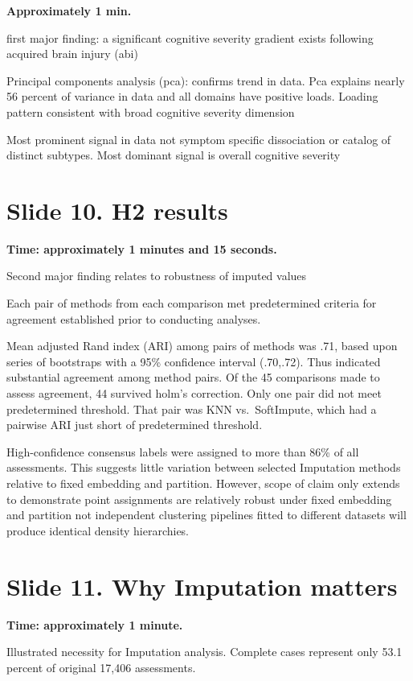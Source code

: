 \documentclass[
  11pt,
]{article}
\begin{document}
\textbf{Approximately 1 min.}

first major finding: a significant cognitive severity gradient exists
following acquired brain injury (abi)

Principal components analysis (pca): confirms trend in data. Pca
explains nearly 56 percent of variance in data and all domains have
positive loads. Loading pattern consistent with broad cognitive severity
dimension

Most prominent signal in data not symptom specific dissociation or
catalog of distinct subtypes. Most dominant signal is overall cognitive
severity

\section{Slide 10. H2 results}\label{slide-10.-h2-results}

\textbf{Time: approximately 1 minutes and 15 seconds.}

Second major finding relates to robustness of imputed values

Each pair of methods from each comparison met predetermined criteria for
agreement established prior to conducting analyses.

Mean adjusted Rand index (ARI) among pairs of methods was .71, based
upon series of bootstraps with a 95\% confidence interval (.70,.72).
Thus indicated substantial agreement among method pairs. Of the 45
comparisons made to assess agreement, 44 survived holm's correction.
Only one pair did not meet predetermined threshold. That pair was KNN
vs.~SoftImpute, which had a pairwise ARI just short of predetermined
threshold.

High-confidence consensus labels were assigned to more than 86\% of all
assessments. This suggests little variation between selected Imputation
methods relative to fixed embedding and partition. However, scope of
claim only extends to demonstrate point assignments are relatively
robust under fixed embedding and partition not independent clustering
pipelines fitted to different datasets will produce identical density
hierarchies.

\section{Slide 11. Why Imputation
matters}\label{slide-11.-why-imputation-matters}

\textbf{Time: approximately 1 minute.}

Illustrated necessity for Imputation analysis. Complete cases represent
only 53.1 percent of original 17,406 assessments.
\end{document}
